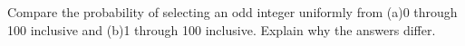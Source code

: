 Compare the probability of selecting an odd integer uniformly from (a)0 through 100 inclusive and (b)1 through 100 inclusive. Explain why the answers differ.
